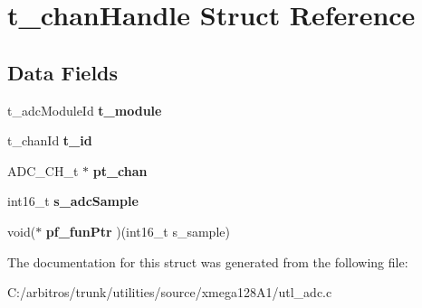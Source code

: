 \hypertarget{structt__chan_handle}{\section{t\-\_\-chan\-Handle Struct Reference}
\label{structt__chan_handle}
}
\subsection*{Data Fields}
\begin{DoxyCompactItemize}
\item 
\hypertarget{structt__chan_handle_a6ac807ac205ab76b1bf99317ca765bdf}{t\-\_\-adc\-Module\-Id {\bfseries t\-\_\-module}}\label{structt__chan_handle_a6ac807ac205ab76b1bf99317ca765bdf}

\item 
\hypertarget{structt__chan_handle_a763f43b20d35ad0faecf3756080b4d80}{t\-\_\-chan\-Id {\bfseries t\-\_\-id}}\label{structt__chan_handle_a763f43b20d35ad0faecf3756080b4d80}

\item 
\hypertarget{structt__chan_handle_a4e1d5aa0bdda779cf36aa45919f7a12a}{A\-D\-C\-\_\-\-C\-H\-\_\-t $\ast$ {\bfseries pt\-\_\-chan}}\label{structt__chan_handle_a4e1d5aa0bdda779cf36aa45919f7a12a}

\item 
\hypertarget{structt__chan_handle_a4362e3180de16ca1aa9d856270c66c98}{int16\-\_\-t {\bfseries s\-\_\-adc\-Sample}}\label{structt__chan_handle_a4362e3180de16ca1aa9d856270c66c98}

\item 
\hypertarget{structt__chan_handle_abf60fe278e4ec7ed455a81f8d270357a}{void($\ast$ {\bfseries pf\-\_\-fun\-Ptr} )(int16\-\_\-t s\-\_\-sample)}\label{structt__chan_handle_abf60fe278e4ec7ed455a81f8d270357a}

\end{DoxyCompactItemize}


The documentation for this struct was generated from the following file\-:\begin{DoxyCompactItemize}
\item 
C\-:/arbitros/trunk/utilities/source/xmega128\-A1/utl\-\_\-adc.\-c\end{DoxyCompactItemize}
